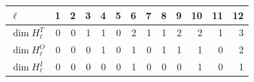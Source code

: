 \begin{tabular}{@{}lrrrrrrrrrrrr@{}}
\toprule
$\ell$ & 1 & 2 & 3 & 4 & 5 & 6 & 7 & 8 & 9 & 10 & 11 & 12 \\
\midrule
$\dim H_\ell^{T}$ & 0 & 0 & 1 & 1 & 0 & 2 & 1 & 1 & 2 & 2 & 1 & 3 \\
$\dim H_\ell^{O}$ & 0 & 0 & 0 & 1 & 0 & 1 & 0 & 1 & 1 & 1 & 0 & 2 \\
$\dim H_\ell^{I}$ & 0 & 0 & 0 & 0 & 0 & 1 & 0 & 0 & 0 & 1 & 0 & 1 \\
\bottomrule
\end{tabular}
